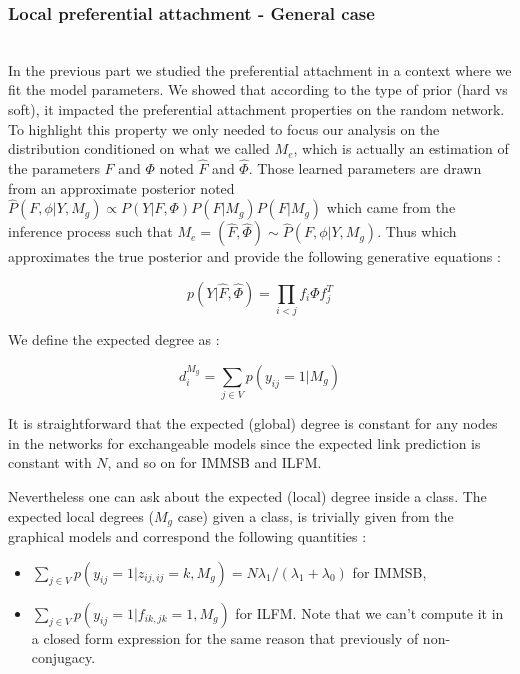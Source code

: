 \subsubsection{Local preferential attachment - General case}~\\

In the previous part we studied the preferential attachment in a context where we fit the model parameters. We showed that according to the type of prior (hard vs soft), it impacted the preferential attachment properties on the random network. To highlight this property we only needed to focus our analysis on the distribution conditioned on what we called $M_e$, which is actually an estimation of the parameters $F$ and $\Phi$ noted $\hat F$ and $\hat \Phi$. Those learned parameters are drawn from an approximate posterior noted $\hat P(F, \phi | Y, M_g) \propto P(Y|F, \Phi)P(F|M_g)P(F|M_g)$ which came from the inference process such that $M_e = (\hat F, \hat \Phi) \sim \hat P(F, \phi | Y, M_g)$. Thus which approximates the true posterior and provide the following generative equations :

\begin{equation}
    p(Y | \hat F, \hat \Phi) = \prod_{i<j} f_i \Phi f_j^T
\end{equation}

We define the expected degree as :

\begin{equation}
d_{i}^{M_g} = \sum_{j\in V} p(y_{ij}=1 | M_g)
\end{equation}

It is straightforward that the expected (global) degree is constant for any nodes in the networks for exchangeable models since  the expected link prediction is constant with $N$, and so on for IMMSB and ILFM. 

Nevertheless one can ask about the  expected (local) degree inside a class. The expected local degrees ($M_g$ case) given a class, is trivially given from the graphical models and correspond the following quantities  :
\begin{itemize}
	\item $\sum_{j\in V} p(y_{ij}=1  | z_{ij, ij}=k, M_g) = N \lambda_1 / (\lambda_1 + \lambda_0)$ for IMMSB,
	\item $\sum_{j\in V} p(y_{ij}=1  | f_{ik, jk}=1, M_g)$  for ILFM. Note that we can't compute it in a closed form expression for the same reason that previously of non-conjugacy.
\end{itemize}


